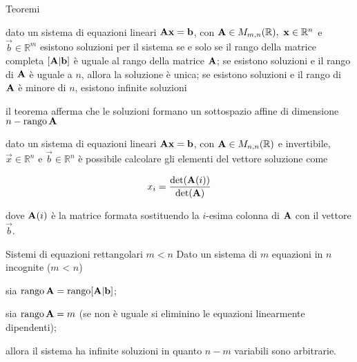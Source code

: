 \documentclass{beamer}
\begin{document}
\begin{frame}[allowframebreaks]{Teoremi}
\begin{theorem}
 dato un sistema di equazioni lineari
 $\mathbf{A}\mathbf{x} = \mathbf{b}$, con
 $\mathbf{A} \in M_{m,n}(\mathbb{R}),\ \mathbf{x} \in \mathbb{R}^n$ e $\vec{b} \in \mathbb{R}^m$
  esistono soluzioni per il sistema se
  e solo se il rango della matrice completa $[\mathbf{A}|\mathbf{b}]$
  è uguale al rango della matrice $\mathbf{A}$;
  se esistono soluzioni e il rango di $\mathbf{A}$
  è uguale a $n$, allora la soluzione è unica;
  se esistono soluzioni e il rango di $\mathbf{A}$
  è minore di $n$, esistono infinite soluzioni
\end{theorem}
il teorema afferma che le soluzioni formano
  un sottospazio affine di dimensione $n - \operatorname{rango}\mathbf{A}$
\framebreak

\begin{theorem}
    dato un sistema di equazioni lineari
    $\mathbf{A}\mathbf{x} = \mathbf{b}$, con
    $\mathbf{A} \in M_{n,n}(\mathbb{R})$ e invertibile,
    $\vec{x} \in \mathbb{R}^n$  e $\vec{b} \in \mathbb{R}^n$
    è possibile calcolare gli elementi del vettore soluzione come

    \[x_i=\frac{\det(\mathbf{A}(i))}{\det(\mathbf{A}	)}\]
 
    dove $\mathbf{A}(i)$ è la matrice formata sostituendo la $i$-esima colonna di
    $\mathbf{A}$ con il vettore $\vec{b}$.

\end{theorem}

\framebreak

\begin{exampleblock}{Sistemi di equazioni rettangolari $m < n$}
    Dato un sistema di $m$ equazioni in $n$ incognite ($m$ < $n$)
    
  sia $\operatorname{rango}\mathbf{A} = \operatorname{rango}[\mathbf{A}|\mathbf{b}]$;
  
  sia $\operatorname{rango}\mathbf{A} = m$ (se non è uguale si eliminino le equazioni linearmente dipendenti);
  
      allora il sistema ha infinite soluzioni in quanto $n - m$ variabili sono arbitrarie.
 \end{exampleblock}
\end{frame}
\end{document}

